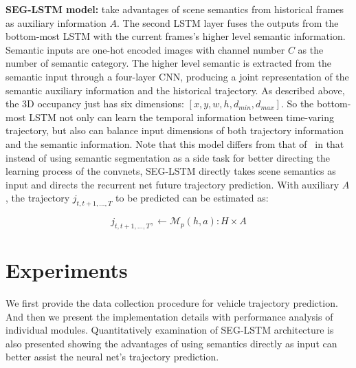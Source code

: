 \documentclass[10pt,twocolumn,letterpaper]{article}
\begin{document}
\vspace{\baselineskip}
\noindent \textbf{SEG-LSTM model:}
 take advantages of scene semantics from  historical frames as auxiliary information $A$. The second LSTM layer fuses the outputs from the bottom-most LSTM with the current frames's higher level semantic information. Semantic inputs are one-hot encoded images with channel number $C$ as the number of semantic category. The higher level semantic is extracted from the semantic input through a four-layer CNN, producing a joint representation of the semantic auxiliary information and the historical trajectory.  As described above, the 3D occupancy just has six dimensions: $[x, y, w, h, d_{min}, d_{max}]$. So the bottom-most LSTM not only can learn the temporal information between time-varing trajectory,  but also can balance input dimensions of both trajectory information and the semantic information.
Note that this model differs from that of~\cite{xu2017end} in that instead of using semantic segmentation as a side task for better directing the learning process of the convnets, SEG-LSTM directly takes scene semantics as input and directs the recurrent net future trajectory prediction. With auxiliary $A$, the trajectory  $j_{t, t+1, \ldots, T}$  to be predicted can be estimated as:

\begin{equation}
j_{t, t+1, \ldots, T}, \leftarrow  \bm{\mathcal{M}}_p(h, a): H \times A
\label{eq:SEG-LSTM}
\end{equation}

\section{Experiments}

We first provide the data collection procedure for vehicle trajectory prediction. And then we present the implementation details with performance analysis of individual modules. Quantitatively examination of SEG-LSTM architecture is also presented showing the advantages of using semantics directly as input can better assist the neural net's trajectory prediction.
\end{document}
